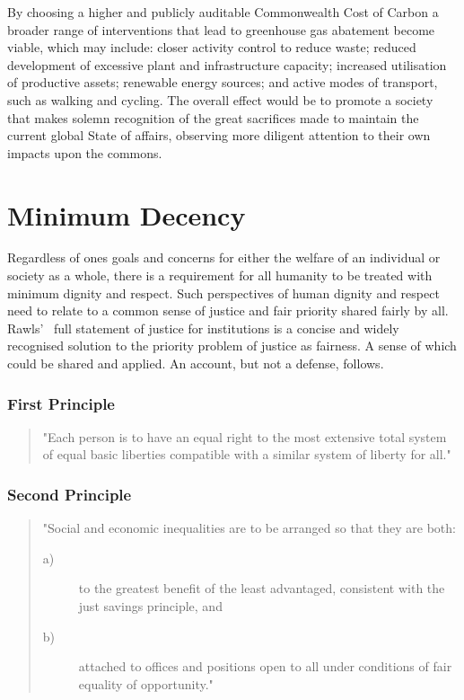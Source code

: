 \documentclass[11pt, oneside]{book}   	%
\begin{document}
By choosing a higher and publicly auditable Commonwealth Cost of Carbon a broader range of interventions that lead to greenhouse gas abatement become viable, which may include: closer activity control to reduce waste; reduced development of excessive plant and infrastructure capacity; increased utilisation of productive assets; renewable energy sources; and active modes of transport, such as walking and cycling.
The overall effect would be to promote a society that makes solemn recognition of the great sacrifices made to maintain the current global State of affairs, observing more diligent attention to their own impacts upon the commons.\

\section{Minimum Decency}
Regardless of ones goals and concerns for either the welfare of an individual or society as a whole, there is a requirement for all humanity to be treated with minimum dignity and respect.
Such perspectives of human dignity and respect need to relate to a common sense of justice and fair priority shared fairly by all.
Rawls'~\cite{jr1} full statement of justice for institutions is a concise and widely recognised solution to the priority problem of justice as fairness.
A sense of which could be shared and applied.
An account, but not a defense, follows.

\subsubsection{First Principle}

\begin{quote}
"Each person is to have an equal right to the most extensive total system of equal basic liberties compatible with a similar system of liberty for all."
\end{quote}

\subsubsection{Second Principle}

\begin{quote}
"Social and economic inequalities are to be arranged so that they are both:
\begin{description}
\item[ a)] to the greatest benefit of the least advantaged, consistent with the just savings principle, and
\item[ b)] attached to offices and positions open to all under conditions of fair equality of opportunity."
\end{description}
\end{quote}
\end{document}
